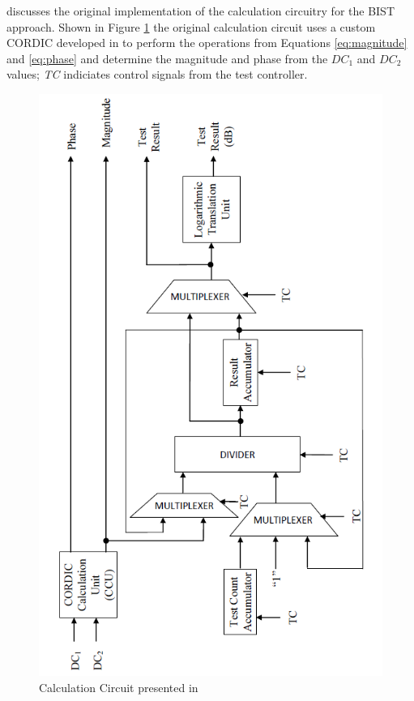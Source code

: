 \documentclass[12pt]{report}
\begin{document}
\cite{joey} discusses the original implementation of the calculation circuitry for the BIST approach.  Shown in Figure \ref{fig:joeycalc} the original calculation circuit uses a custom CORDIC developed in \cite{joey} to perform the operations from Equations \ref{eq:magnitude} and \ref{eq:phase} and determine the magnitude and phase from the $DC_1$ and $DC_2$ values; \textit{TC} indiciates control signals from the test controller.
\begin{figure}
	\begin{center}
		\includegraphics[scale=1]{images/joey-calculation}
	\end{center}
	\caption{Calculation Circuit presented in \cite{joey}}
	\label{fig:joeycalc}
\end{figure}
\end{document}
